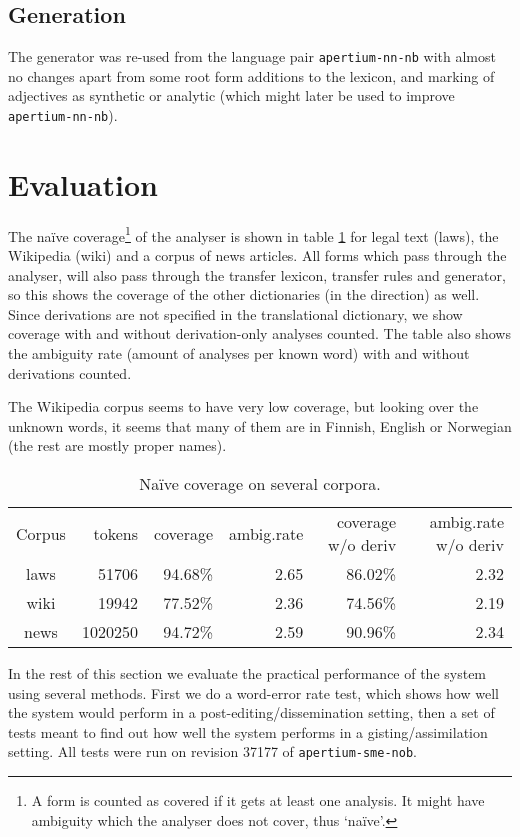 \subsection{Generation}
The generator was re-used from the language pair
\texttt{apertium-nn-nb} with almost no changes apart from some root
form additions to the lexicon, and marking of adjectives as synthetic
or analytic (which might later be used to improve
\texttt{apertium-nn-nb}).

\section{Evaluation}
\label{sec:eval}
The na\"{i}ve coverage\footnote{A form is counted as covered if it gets at
  least one analysis. It might have ambiguity which the analyser does
  not cover, thus `na\"{i}ve'.} of the analyser is shown in table
\ref{table:cov} for legal text (laws), the \sme{} Wikipedia (wiki) and
a corpus of \sme{} news articles. All forms which pass through the
analyser, will also pass through the transfer lexicon, transfer rules
and generator, so this shows the coverage of the other dictionaries
(in the \smenob{} direction) as well. Since derivations are not
specified in the translational dictionary, we show coverage with and
without derivation-only analyses counted. The table also shows the
ambiguity rate (amount of analyses per known word) with and without
derivations counted. 

The Wikipedia corpus seems to have very low coverage, but looking over
the unknown words, it seems that many of them are in Finnish, English
or Norwegian (the rest are mostly proper names).


\begin{table}
  \begin{center}
  \begin{tabular}{crrrrr}
   Corpus     & tokens   & coverage & ambig.rate  & coverage w/o deriv & ambig.rate w/o deriv \\
   laws       &  51706   & 94.68\%  & 2.65        & 86.02\%            & 2.32 \\
   wiki       & 19942    & 77.52\%  & 2.36        & 74.56\%            & 2.19 \\
   news       & 1020250  & 94.72\%  & 2.59        & 90.96\%            & 2.34 \\
  \end{tabular}
    \caption{Na\"{i}ve coverage on several corpora.}
    \label{table:cov}
  \end{center}
\end{table}
In the rest of this section we evaluate the practical performance of
the system using several methods. First we do a word-error rate test,
which shows how well the system would perform in a
post-editing/dissemination setting, then a set of tests meant to find
out how well the system performs in a gisting/assimilation setting.
All tests were run on revision 37177 of \texttt{apertium-sme-nob}.



